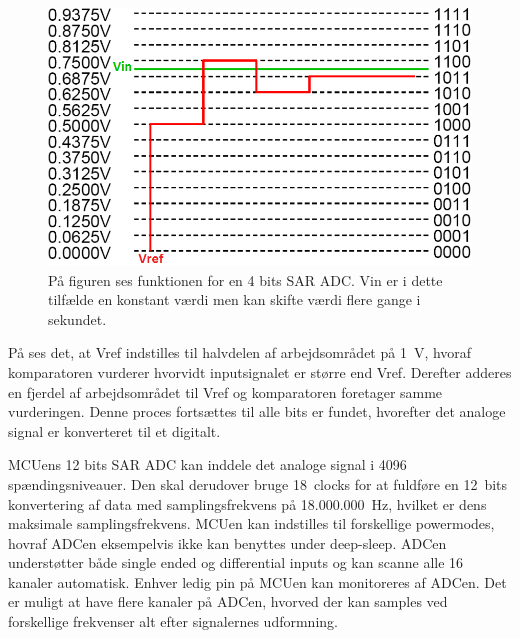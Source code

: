 \begin{figure}[H]
	\centering
	\includegraphics[scale=0.52]{figures/bProblemloesning/SAR_ADC.png}
	\caption{På figuren ses funktionen for en 4 bits SAR ADC. Vin er i dette tilfælde en konstant værdi men kan skifte værdi flere gange i sekundet.}
	\label{fig:SAR_ADC}
\end{figure}\vspace{-0.25cm}
På  ses det, at Vref indstilles til halvdelen af arbejdsområdet på 1~V, hvoraf komparatoren vurderer hvorvidt inputsignalet er større end Vref. Derefter adderes en fjerdel af arbejdsområdet til Vref og komparatoren foretager samme vurderingen. Denne proces fortsættes til alle bits er fundet, hvorefter det analoge signal er konverteret til et digitalt.

MCUens 12 bits SAR ADC kan inddele det analoge signal i 4096 spændingsniveauer. Den skal derudover bruge 18~clocks for at fuldføre en 12~bits konvertering af data med samplingsfrekvens på 18.000.000~Hz, hvilket er dens maksimale samplingsfrekvens. MCUen kan indstilles til forskellige powermodes, hovraf ADCen eksempelvis ikke kan benyttes under deep-sleep. \newline 
ADCen understøtter både single ended og differential inputs og kan scanne alle 16 kanaler automatisk. Enhver ledig pin på MCUen kan monitoreres af ADCen. Det er muligt at have flere kanaler på ADCen, hvorved der kan samples ved forskellige frekvenser alt efter signalernes udformning.~\citep{Semiconductor20164200M}

